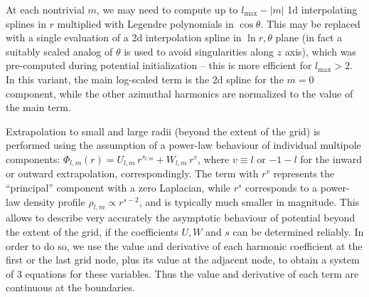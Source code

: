 \documentclass[12pt]{article}
\begin{document}
At each nontrivial $m$, we may need to compute up to $l_\mathrm{max}-|m|$ 1d interpolating splines in $r$ multiplied with Legendre polynomials in $\cos\theta$. This may be replaced with a single evaluation of a 2d interpolation spline in $\ln r,\theta$ plane (in fact a suitably scaled analog of $\theta$ is used to avoid singularities along $z$ axis), which was pre-computed during potential initialization -- this is more efficient for $l_\mathrm{max}>2$. In this variant, the main log-scaled term is the 2d spline for the $m=0$ component, while the other azimuthal harmonics are normalized to the value of the main term.

Extrapolation to small and large radii (beyond the extent of the grid) is performed using the assumption of a power-law behaviour of individual multipole components: $\Phi_{l,m}(r) = U_{l,m}\, r^{s_{l,m}} + W_{l,m}\, r^{v}$, where $v\equiv l$ or $-1-l$ for the inward or outward extrapolation, correspondingly. The term with $r^v$ represents the ``principal'' component with a zero Laplacian, while $r^s$ corresponds to a power-law density profile $\rho_{l,m}\propto r^{s-2}$, and is typically much smaller in magnitude. This allows to describe very accurately the asymptotic behaviour of potential beyond the extent of the grid, if the coefficients $U,W$ and $s$ can be determined reliably. In order to do so, we use the value and derivative of each harmonic coefficient at the first or the last grid node, plus its value at the adjacent node, to obtain a system of 3 equations for these variables. Thus the value and derivative of each term are continuous at the boundaries. 
\end{document}
